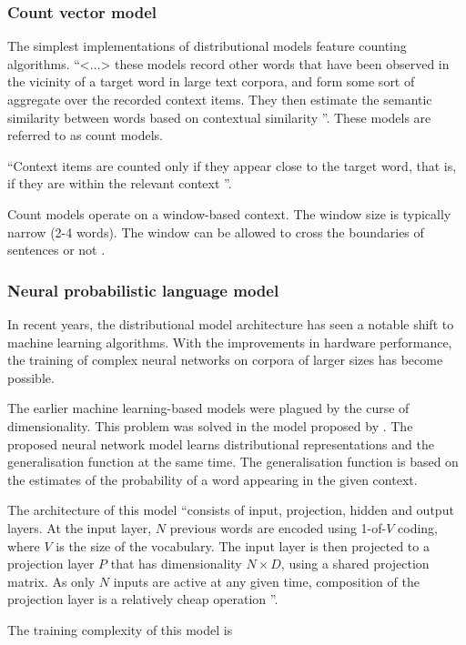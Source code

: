 \documentclass[14pt, a4paper]{extreport}
\begin{document}
      \subsubsection{Count vector model}
The simplest implementations of distributional models feature counting algorithms. ``<...> these models record other words that have been observed in the vicinity of a target word in large text corpora, and form some sort of aggregate over the recorded context items. They then estimate the semantic similarity between words based on contextual similarity \parencite{erkkatrin2}''. These models are referred to as count models.

``Context items are counted only if they appear close to the target word, that is, if they are within the relevant context \parencite{erkkatrin2}''.

Count models operate on a window-based context. The window size is typically narrow (2-4 words). The window can be allowed to cross the boundaries of sentences or not \parencite{baroni}.
      \subsubsection{Neural probabilistic language model}
In recent years, the distributional model architecture has seen a notable shift to machine learning algorithms. With the improvements in hardware performance, the training of complex neural networks on corpora of larger sizes has become possible. 

The earlier machine learning-based models were plagued by the curse of dimensionality. This problem was solved in the model proposed by \parencite{bengio}. The proposed neural network model learns distributional representations and the generalisation function at the same time. The generalisation function is based on the estimates of the probability of a word appearing in the given context.

The architecture of this model ``consists of input, projection, hidden and output layers. At the input layer, \(N\) previous words are encoded using 1-of-\(V\) coding, where \(V\) is the size of the vocabulary. The input layer is then projected to a projection layer \(P\) that has dimensionality \(N \times D\), using a shared projection matrix. As only \(N\) inputs are active at any given time, composition of the projection layer is a relatively cheap operation \parencite{mikolov}''.

The training complexity of this model is
\end{document}
